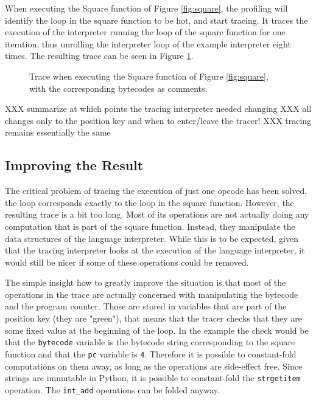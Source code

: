 \documentclass{acm_proc_article-sp}
\begin{document}
When executing the Square function of Figure \ref{fig:square}, the profiling
will identify the loop in the square function to be hot, and start tracing. It
traces the execution of the interpreter running the loop of the square function
for one iteration, thus unrolling the interpreter loop of the example
interpreter eight times. The resulting trace can be seen in Figure 
\ref{fig:trace-no-green-folding}.

\begin{figure}

\caption{Trace when executing the Square function of Figure \ref{fig:square},
with the corresponding bytecodes as comments.}
\label{fig:trace-no-green-folding}
\end{figure}

XXX summarize at which points the tracing interpreter needed changing
XXX all changes only to the position key and when to enter/leave the tracer!
XXX tracing remains essentially the same

\subsection{Improving the Result}

The critical problem of tracing the execution of just one opcode has been
solved, the loop corresponds exactly to the loop in the square function.
However, the resulting trace is a bit too long. Most of its operations are not
actually doing any computation that is part of the square function. Instead,
they manipulate the data structures of the language interpreter. While this is
to be expected, given that the tracing interpreter looks at the execution of the
language interpreter, it would still be nicer if some of these operations could
be removed.

The simple insight how to greatly improve the situation is that most of the
operations in the trace are actually concerned with manipulating the
bytecode and the program counter. Those are stored in variables that are part of
the position key (they are "green"), that means that the tracer checks that they
are some fixed value at the beginning of the loop. In the example the check
would be that the \texttt{bytecode} variable is the bytecode string
corresponding to the square function and that the \texttt{pc} variable is
\texttt{4}. Therefore it is possible to constant-fold computations on them away,
as long as the operations are side-effect free. Since strings are immutable in
Python, it is possible to constant-fold the \texttt{strgetitem} operation. The
\texttt{int\_add} operations can be folded anyway.
\end{document}

